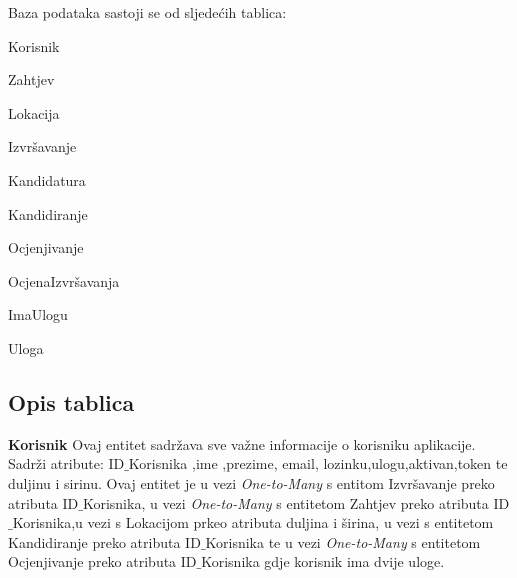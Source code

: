 		Baza podataka sastoji se od sljedećih tablica:
		
		\begin{packed_item}
			\item Korisnik
			\item Zahtjev
			\item Lokacija
			\item Izvršavanje
			\item Kandidatura
			\item Kandidiranje
			\item Ocjenjivanje
			\item OcjenaIzvršavanja
			\item ImaUlogu 
			\item Uloga
			
		\end{packed_item}
		
			\subsection{Opis tablica}
			
					    \textbf{ Korisnik}
		    \text Ovaj entitet sadržava sve važne informacije o korisniku aplikacije. Sadrži atribute: ID${\_}$Korisnika ,ime ,prezime,
		     email, lozinku,ulogu,aktivan,token te duljinu i sirinu. Ovaj entitet je u vezi \emph{One-to-Many} s entitom Izvršavanje preko atributa ID${\_}$Korisnika, u vezi \emph{One-to-Many} s entitetom Zahtjev preko atributa ID${\_}$Korisnika,u vezi s Lokacijom prkeo atributa duljina i širina, u vezi s entitetom Kandidiranje preko atributa ID${\_}$Korisnika te u vezi \emph{One-to-Many} s entitetom Ocjenjivanje preko atributa ID${\_}$Korisnika gdje korisnik ima dvije uloge. 
				
